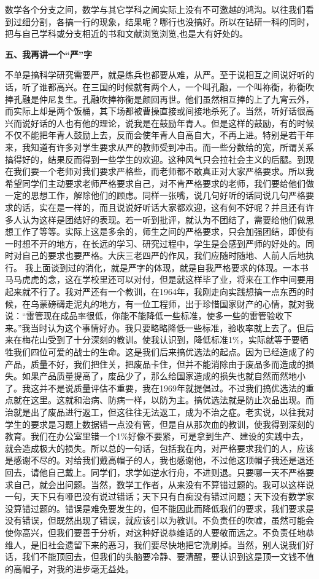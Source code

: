 \documentclass[twoside,openright,headings=optiontohead]{ctexbook} %
\begin{document}
{数学各个分支之间，数学与其它学科之闻实际上没有不可邀越的鸿沟。以往我们看到过细分割，各搞一行的现象，结果呢？哪行也没搞好。所以在钻研一科的同时，把与自己学科或分支相近的书和文献浏览浏览,也是大有好处的。

\textbf{五、我再讲一个``严''字}

不单是搞科学研究需要严，就是练兵也都要从难，从严。至于说相互之间说好听的话，听了谁都高兴。在三国的时候就有两个人，一个叫孔融，一个叫祢衡，祢衡吹捧孔融是仲尼复生。孔融吹捧祢衡是颜回再世。他们虽然相互捧的上了九宵云外，而实际上却是两个饭桶，其下场都被曹操直接或间接地杀死了。当然，听好话很高兴而说好话的人也有他的理论，说我是在鼓励年青人。但是这样的鼓励，有的时候不仅不能把年青人鼓励上去，反而会使年青人自高自大，不再上进。特别是若干年来，我知道有许多对学生要求从严的教师受到冲击。而一些分数给的宽，所谓关系搞得好的，结果反而得到一些学生的欢迎。这种风气只会拉社会主义的后腿。到现在我们要一个老师对我们要求严格些，而老师都不敢真正对大家严格要求。所以我希望同学们主动要求老师严格要求自己，对不肯严格要求的老师，我们要给他们做一定的思想工作，解除他们的顾虑。同样一张嘴，说几句好听的话同说几句严格要求的话，实在是一样的，而且说说好听话大家都欢迎，这有何不好呢？并且还有许多人认为这样是团结好的表现。若一听到批评，就认为不团结了，需要给他们做思想工作了等等。实际上这是多余的，师生之间的严格要求，只会加强团结，即使有一时想不开的地方，在长远的学习、研究过程中，学生是会感到严师的好处的。同时对自己的要求也要严格。大庆三老四严的作风，我们应随时随地、人前人后地执行。
我上面谈到过的消化，就是严字的体现，就是自我严格要求的体现。一本书马马虎虎的念，这在学校里还可以对付，但是就这样毕了业，将来在工作中间要用起来就不行了。我对严还有一个教训，在1964年，我刚走向实践想搞一点东西的时候，在乌蒙磅礴走泥丸的地方，有一位工程师，出于珍惜国家财产的心情，就对我说：``雷管现在成品率很低，你能不能降低一些标准，使多一些的雷管验收下来。''我当时认为这个事情好办。我只要略略降低一些标准，验收率就上去了。但后来在梅花山受到了十分深刻的教训。使我认识到，降低标准1\%，实际就等于要牺牲我们四位可爱的战士的生命。这是我们后来搞优选法的起点。因为已经造成了的产品，质量不好，我们把住关，把废品卡住，但并不能消除由于废品多而造成的损失。如果产品质量提高了，废品少了，那么给国家造成的损失也就自然而然地小了。我这并不是说质量评估不重要，我在1969年就提倡过。不过我们搞优选法的重点就在这里。这就和治病、防病一样，以防为主。搞优选法就是防止次品出现。而治就是出了废品进行返工，但这往往无法返工，成为不治之症。老实说，以往我对学生的要求是习题上数据错一点没有管，但是自从那次血的教训，使我得到深刻的教育。我们在办公室里错一个1\%好像不要紧，可是拿到生产、建设的实践中去，就会造成极大的损失。所以总的一句话，包括我在内，对严格要求我们的人，应该是感谢不尽的。对给我们戴高帽子的人，我也感谢他，不过他这顶帽子我还是退还回去，请他自己戴上。同学们，求学如逆水行舟，不进则退。只要哪一天不严格要求自己，就会出问题。当然，数学工作者，从来没有不算错过题的。我可以这样说一句，天下只有哑巴没有说过错话；天下只有白痴没有错过问题；天下没有数学家没算错过题的。错误是难免要发生的，但不能因此而降低我们的要求，我们要求是没有错误，但既然出现了错误，就应该引以为教训。不负责任的吹嘘，虽然可能会使你高兴，但我们要善于分析，对这种好说恭维话的人要敬而远之。不负责任地恭维人，是旧社会遗留下来的恶习，我们要尽快地把它洗刷掉。当然，别人说我们好话，我们不能顶回去，但我们的头脑要冷静、要清醒，要认识到这是顶一文钱不值的高帽子，对我的进步毫无益处。

}
\end{document}
